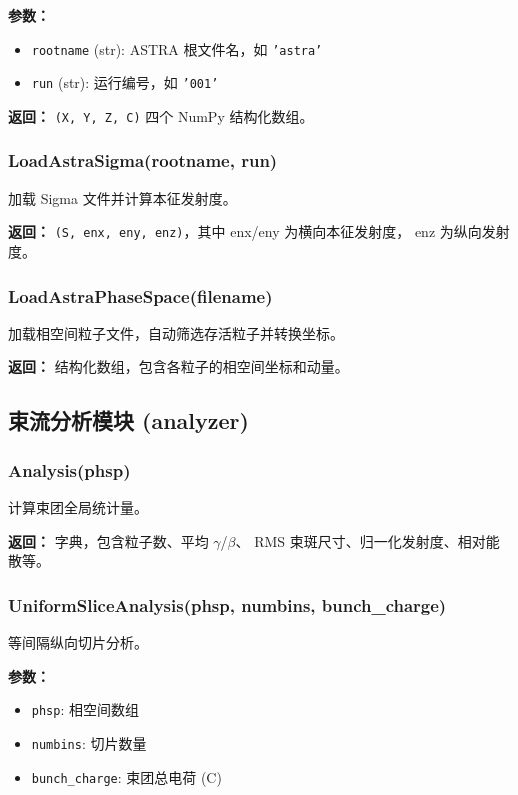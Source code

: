 \documentclass[11pt,a4paper]{article}
\begin{document}
\textbf{参数：}
\begin{itemize}
    \item \texttt{rootname} (str): ASTRA 根文件名，如 \texttt{'astra'}
    \item \texttt{run} (str): 运行编号，如 \texttt{'001'}
\end{itemize}

\textbf{返回：} \texttt{(X, Y, Z, C)} 四个 NumPy 结构化数组。

\subsubsection{LoadAstraSigma(rootname, run)}
加载 Sigma 文件并计算本征发射度。

\textbf{返回：} \texttt{(S, enx, eny, enz)}，其中 enx/eny 为横向本征发射度，
enz 为纵向发射度。

\subsubsection{LoadAstraPhaseSpace(filename)}
加载相空间粒子文件，自动筛选存活粒子并转换坐标。

\textbf{返回：} 结构化数组，包含各粒子的相空间坐标和动量。

\subsection{束流分析模块 (analyzer)}

\subsubsection{Analysis(phsp)}
计算束团全局统计量。

\textbf{返回：} 字典，包含粒子数、平均 $\gamma$/$\beta$、
RMS 束斑尺寸、归一化发射度、相对能散等。

\subsubsection{UniformSliceAnalysis(phsp, numbins, bunch\_charge)}
等间隔纵向切片分析。

\textbf{参数：}
\begin{itemize}
    \item \texttt{phsp}: 相空间数组
    \item \texttt{numbins}: 切片数量
    \item \texttt{bunch\_charge}: 束团总电荷 (C)
\end{itemize}
\end{document}
